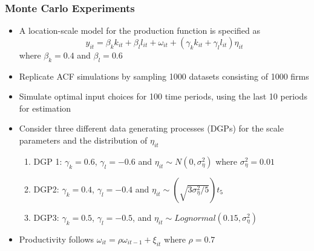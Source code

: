 \documentclass[xcolor={dvipsnames}, notheorems]{beamer}
\theoremstyle{plain}
\begin{document}
\begin{frame}
\frametitle{Monte Carlo Experiments}
\begin{itemize}
    \item A location-scale model for the production function is specified as
    \begin{equation} \label{simmodel}
    y_{it}=\beta_{k}k_{it}+\beta_{l}l_{it}+\omega_{it}+(\gamma_{k}k_{it}+\gamma_{l}l_{it})\eta_{it}
    \end{equation}
    where $\beta_{k}=0.4$ and $\beta_{l}=0.6$
    \item Replicate ACF simulations by sampling 1000 datasets consisting of 1000 firms
    \item Simulate optimal input choices for 100 time periods, using the last 10 periods for estimation
    \item Consider three different data generating processes (DGPs) for the scale parameters and the distribution of $\eta_{it}$
    \begin{enumerate}
        \item DGP 1: $\gamma_{k}=0.6$, $\gamma_{l}=-0.6$ and $\eta_{it}\sim N(0,\sigma_{\eta}^{2})$ where $\sigma_{\eta}^{2}=0.01$
        \item DGP2: $\gamma_{k}=0.4$, $\gamma_{l}=-0.4$ and $\eta_{it}\sim (\sqrt{3\sigma_{\eta}^{2}/5})t_{5}$
        \item DGP3: $\gamma_{k}=0.5$, $\gamma_{l}=-0.5$, and $\eta_{it}\sim Lognormal(0.15,\sigma_{\eta}^{2})$
    \end{enumerate}
    \item Productivity follows $\omega_{it}=\rho\omega_{it-1}+\xi_{it}$ where $\rho=0.7$
\end{itemize}
\end{frame}

\end{document}
